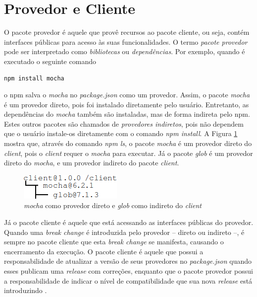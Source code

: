 \section{Provedor e Cliente}
\label{ref-teo:prov_clie}
O pacote provedor é aquele que provê recursos ao pacote cliente, ou seja, contém interfaces públicas para acesso às suas funcionalidades. O termo \textit{pacote provedor} pode ser interpretado como \textit{bibliotecas} ou \textit{dependências}. Por exemplo, quando é executado o seguinte comando

\begin{lstlisting}[style=bash, label=cod:install:provider]
npm install mocha
\end{lstlisting}
o \gls{npm} salva o \textit{mocha} no \textit{package.json} como um provedor. Assim, o pacote \textit{mocha} é um provedor direto, pois foi instalado diretamente pelo usuário. Entretanto, as dependências do \textit{mocha} também são instaladas, mas de forma indireta pelo \gls{npm}. Estes outros pacotes são chamados de \textit{provedores indiretos}, pois não dependem que o usuário instale-os diretamente com o comando \textit{npm install}. A Figura \ref{fig:provider} mostra que, através do comando \textit{npm ls}, o pacote \textit{mocha} é um provedor direto do \textit{client}, pois o \textit{client} requer o \textit{mocha} para executar. Já o pacote \textit{glob} é um provedor direto do \textit{mocha}, e um provedor indireto do pacote \textit{client}.

\begin{figure}
    \centering
    \includegraphics{figuras/provider_directly_undirectly.png}
    \caption{\textit{mocha} como provedor direto e \textit{glob} como indireto do \textit{client}}
    \label{fig:provider}
\end{figure}{}

Já o pacote cliente é aquele que está acessando as interfaces públicas do provedor. Quando uma \textit{break change} é introduzida pelo provedor -- direto ou indireto --, é sempre no pacote cliente que esta \textit{break change} se manifesta, causando o encerramento da execução. O pacote cliente é aquele que possui a responsabilidade de atualizar a versão de seus provedores no \textit{package.json} quando esses publicam uma \textit{release} com correções, enquanto que o pacote provedor possui a responsabilidade de indicar o nível de compatibilidade que sua nova \textit{release} está introduzindo \cite{teorical_reference:semver}.

